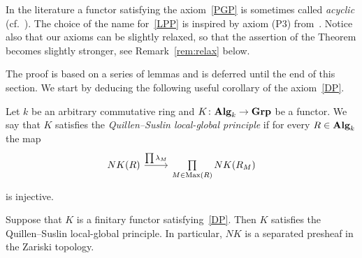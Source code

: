 \documentclass[oneside, 11pt]{amsart} \pdfoutput=1
\begin{document}
\begin{rem}
 In the literature a functor satisfying the axiom~\ref{PGP} is sometimes called {\it acyclic} (cf.~\cite[Def.~III.4.1.1]{Kbook}).
 The choice of the name for~\eqref{LPP} is inspired by axiom (P3) from~\cite[Proposition~3.3.4]{AHW18}.
 Notice also that our axioms can be slightly relaxed, so that the assertion of the Theorem becomes slightly stronger, see Remark~\ref{rem:relax} below.
\end{rem}

The proof is based on a series of lemmas and is deferred until the end of this section. We start by deducing the following useful corollary of the axiom~\ref{DP}. 

Let $k$ be an arbitrary commutative ring and $K\colon {\normalfont\textbf{Alg}}_k \to {\normalfont\textbf{Grp}}$ be a functor.
We say that $K$ satisfies the {\it Quillen--Suslin local-global principle} if for every $R\in {\normalfont\textbf{Alg}}_k$ the map 
\begin{equation} \label{QS-def} \begin{tikzcd} NK(R) \ar{r}{\prod \lambda_M} & \prod\limits_{M \in \Max(R)} NK(R_M) \end{tikzcd} \end{equation} is injective.
\begin{lemma}\label{LGP}
Suppose that $K$ is a finitary functor satisfying~\ref{DP}. Then $K$ satisfies the Quillen--Suslin local-global principle. In particular, $NK$ is a separated presheaf in the Zariski topology.
\end{lemma}
\end{document}
